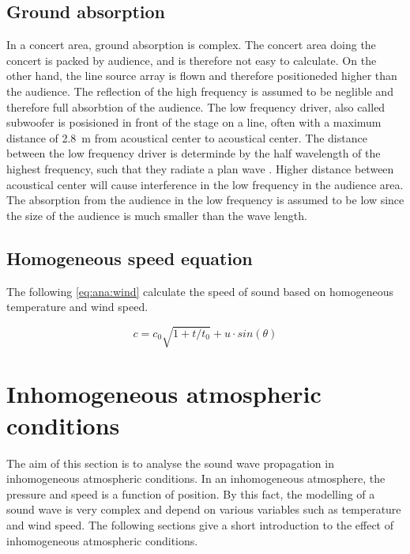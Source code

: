  
\subsection{Ground absorption} 
In a concert area, ground absorption is complex. The concert area doing the concert is packed by audience, and is therefore not easy to calculate. On the other hand, the line source array is flown and therefore positioneded higher than the audience. The reflection of the high frequency is assumed to be neglible and therefore full absorbtion of the audience. The low frequency driver, also called subwoofer is posisioned in front of the stage on a line, often with a maximum distance of \SI{2.8}{\meter} from acoustical center to acoustical center. The distance between the low frequency driver is determinde by the half wavelength of the highest frequency, such that they radiate a plan wave \citep{bauman2001wavefront}. Higher distance between acoustical center will cause interference in the low frequency in the audience area. The absorption from the audience in the low frequency is assumed to be low since the size of the audience is much smaller than the wave length.   


 
 \subsection{Homogeneous speed equation}\label{sec:ana:inhom_ats_con}
 The following \autoref{eq:ana:wind} calculate the speed of sound based on homogeneous temperature and wind speed.

\begin{equation}\label{eq:ana:wind}
c =  c_0 \sqrt{1+t/t_0} + u \cdot sin(\theta)
\end{equation}  

\startexplain
{}
\stopexplain


 
\section{Inhomogeneous atmospheric conditions} 
The aim of this section is to analyse the sound wave propagation in inhomogeneous atmospheric conditions. In an inhomogeneous atmosphere, the pressure and speed is a function of position. By this fact, the modelling of a sound wave is very complex and depend on various variables such as temperature and wind speed. The following sections give a short introduction to the effect of inhomogeneous atmospheric conditions. 
 
